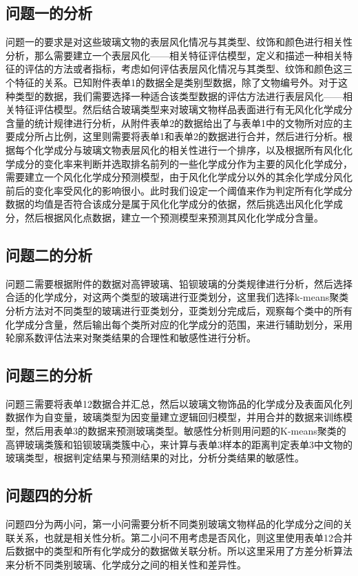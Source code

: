 \documentclass[withoutpreface,bwprint]{cumcmthesis}%
\begin{document}
	\subsection{问题一的分析}
	问题一的要求是对这些玻璃文物的表层风化情况与其类型、纹饰和颜色进行相关性分析，那么需要建立一个表层风化——相关特征评估模型，定义和描述一种相关特征的评估的方法或者指标，考虑如何评估表层风化情况与其类型、纹饰和颜色这三个特征的关系。已知附件表单1的数据全是类别型数据，除了文物编号外。对于这种类型的数据，我们需要选择一种适合该类型数据的评估方法进行表层风化——相关特征评估模型。然后结合玻璃类型来对玻璃文物样品表面进行有无风化化学成分含量的统计规律进行分析，从附件表单2的数据给出了与表单1中的文物所对应的主要成分所占比例，这里则需要将表单1和表单2的数据进行合并，然后进行分析。根据每个化学成分与玻璃文物表层风化的相关性进行一个排序，以及根据所有风化化学成分的变化率来判断并选取排名前列的一些化学成分作为主要的风化化学成分，需要建立一个风化化学成分预测模型，由于风化化学成分以外的其余化学成分风化前后的变化率受风化的影响很小。此时我们设定一个阈值来作为判定所有化学成分数据的均值是否符合该成分是属于风化化学成分的依据，然后挑选出风化化学成分，然后根据风化点数据，建立一个预测模型来预测其风化化学成分含量。
	
	\subsection{问题二的分析}
	问题二需要根据附件的数据对高钾玻璃、铅钡玻璃的分类规律进行分析，然后选择合适的化学成分，对这两个类型的玻璃进行亚类划分，这里我们选择k-means聚类分析方法对不同类型的玻璃进行亚类划分，亚类划分完成后，观察每个类中的所有化学成分含量，然后输出每个类所对应的化学成分的范围，来进行辅助划分，采用轮廓系数评估法来对聚类结果的合理性和敏感性进行分析。
	
	\subsection{问题三的分析}
	问题三需要将表单12数据合并汇总，然后以玻璃文物饰品的化学成分及表面风化列数据作为自变量，玻璃类型为因变量建立逻辑回归模型，并用合并的数据来训练模型，然后用表单3的数据来预测玻璃类型。敏感性分析则用问题的K-means聚类的高钾玻璃类簇和铅钡玻璃类簇中心，来计算与表单3样本的距离判定表单3中文物的玻璃类型，根据判定结果与预测结果的对比，分析分类结果的敏感性。
	
	\subsection{问题四的分析}
	问题四分为两小问，第一小问需要分析不同类别玻璃文物样品的化学成分之间的关联关系，也就是相关性分析。第二小问不用考虑是否风化，则这里使用表单12合并后数据中的类型和所有化学成分的数据做关联分析。所以这里采用了方差分析算法来分析不同类别玻璃、化学成分之间的相关性和差异性。
	
\end{document}
